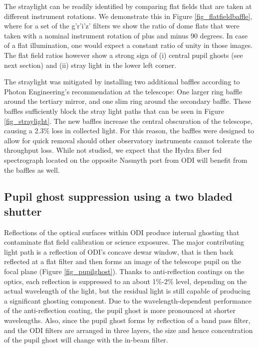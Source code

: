 \documentclass[]{spieman}
\begin{document}
The straylight  can be readily identified by comparing flat fields that are
taken at different instrument rotations. We demonstrate this in Figure
\ref{fig_flatfieldbaffle}, where for a set of the g'r'i'z' filters we show the
ratio of dome flats that were taken with a nominal instrument rotation of plus
and minus 90 degrees.  In case of a flat illumination, one would expect a
constant ratio of unity in those images. The flat field ratios however show a
strong sign of (i) central pupil ghosts (see next section) and (ii) stray light
in the lower left corner.

The straylight was mitigated by installing two additional baffles according to
Photon Engineering's recommendation  at the telescope: One larger ring baffle
around the tertiary mirror, and one slim ring around the secondary baffle. These
baffles sufficiently block the stray light paths that can be seen in Figure
\ref{fig_straylight}. The new baffles increase the central obscuration of the 
telescope, causing a 2.3\% loss in collected light. For this reason, the baffles 
were designed to allow for quick removal should other observatory instruments
cannot tolerate the throughput loss. While not studied, we expect that the Hydra
fiber fed spectrograph located on the opposite Nasmyth port from ODI will benefit
from the baffles as well.


\subsection{Pupil ghost suppression using a two bladed shutter}
\label{sect_ghost}

Reflections of the optical surfaces within ODI produce internal ghosting that
contaminate flat field calibration or science exposures. The major contributing
light path is a reflection of ODI’s concave dewar window, that is then back
reflected at a flat filter and then forms an image of the telescope pupil on the
focal plane (Figure \ref{fig_pupilghost}).  Thanks to anti-reflection coatings
on the optics, each reflection is suppressed to an about 1\%-2\% level,
depending on the actual wavelength of the light, but the residual light is still
capable of producing a significant ghosting component. Due to the
wavelength-dependent performance of the anti-reflection coating, the pupil ghost
is more pronounced at shorter wavelengths. Also, since the pupil ghost forms by
reflection of a band pass filter, and the ODI filters are arranged in three
layers, the size and hence concentration of the pupil ghost will change with the 
in-beam filter.
\end{document}
